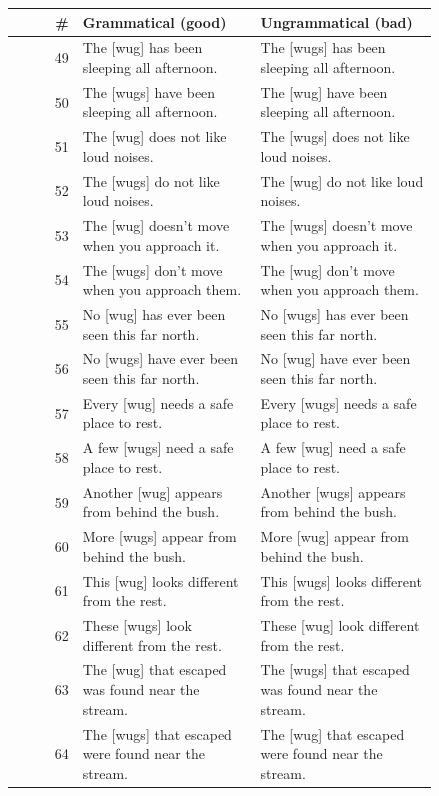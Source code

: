 \begin{table}[p]
\centering
\footnotesize
\begin{tabular}{@{}rp{0.42\linewidth}p{0.42\linewidth}@{}}
\hline
\# & Grammatical (good) & Ungrammatical (bad) \\
\hline
49 & The {[}wug{]} has been sleeping all afternoon. & The {[}wugs{]} has been sleeping all afternoon. \\
50 & The {[}wugs{]} have been sleeping all afternoon. & The {[}wug{]} have been sleeping all afternoon. \\
51 & The {[}wug{]} does not like loud noises. & The {[}wugs{]} does not like loud noises. \\
52 & The {[}wugs{]} do not like loud noises. & The {[}wug{]} do not like loud noises. \\
53 & The {[}wug{]} doesn't move when you approach it. & The {[}wugs{]} doesn't move when you approach it. \\
54 & The {[}wugs{]} don't move when you approach them. & The {[}wug{]} don't move when you approach them. \\
55 & No {[}wug{]} has ever been seen this far north. & No {[}wugs{]} has ever been seen this far north. \\
56 & No {[}wugs{]} have ever been seen this far north. & No {[}wug{]} have ever been seen this far north. \\
57 & Every {[}wug{]} needs a safe place to rest. & Every {[}wugs{]} needs a safe place to rest. \\
58 & A few {[}wugs{]} need a safe place to rest. & A few {[}wug{]} need a safe place to rest. \\
59 & Another {[}wug{]} appears from behind the bush. & Another {[}wugs{]} appears from behind the bush. \\
60 & More {[}wugs{]} appear from behind the bush. & More {[}wug{]} appear from behind the bush. \\
61 & This {[}wug{]} looks different from the rest. & This {[}wugs{]} looks different from the rest. \\
62 & These {[}wugs{]} look different from the rest. & These {[}wug{]} look different from the rest. \\
63 & The {[}wug{]} that escaped was found near the stream. & The {[}wugs{]} that escaped was found near the stream. \\
64 & The {[}wugs{]} that escaped were found near the stream. & The {[}wug{]} that escaped were found near the stream. \\

\end{tabular}
\end{table}
